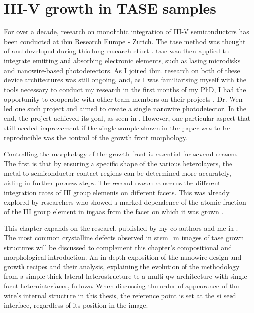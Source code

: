 \chapter{III-V growth in TASE samples}
\label{chap:growth}

For over a decade, research on monolithic integration of III-V semiconductors has been conducted at \acs{ibm} Research Europe - Zurich. The \acf{tase} method was thought of and developed during this long research effort \cite{borgTASEp2018, Mauthe2021}. \acs{tase} was then applied to integrate emitting and absorbing electronic elements, such as lasing microdisks and nanowire-based photodetectors. As I joined \acs{ibm}, research on both of these device architectures was still ongoing, and, as I was familiarising myself with the tools necessary to conduct my research in the first months of my PhD, I had the opportunity to cooperate with other team members on their projects \cite{Tiwari2021}. Dr. Wen led one such project and aimed to create a single nanowire photodetector. In the end, the project achieved its goal, as seen in \cite{Wen2022}. However, one particular aspect that still needed improvement if the single sample shown in the paper was to be reproducible was the control of the growth front morphology.

Controlling the morphology of the growth front is essential for several reasons. The first is that by ensuring a specific shape of the various heterolayers, the metal-to-semiconductor contact regions can be determined more accurately, aiding in further process steps. The second reason concerns the different integration rates of III group elements on different facets. This was already explored by researchers who showed a marked dependence of the atomic fraction of the III group element in \acs{ingaas} from the facet on which it was grown \cite{Borg2019}.

This chapter expands on the research published by my co-authors and me in \cite{Brugnolotto2023}. The most common crystalline defects observed in \acs{stem_m} images of \acs{tase} grown structures will be discussed to complement this chapter's compositional and morphological introduction. An in-depth exposition of the nanowire design and growth recipes and their analysis, explaining the evolution of the methodology from a simple thick lateral heterostructure to a multi-\acl{qw} architecture with single facet heterointerfaces, follows. When discussing the order of appearance of the wire's internal structure in this thesis, the reference point is set at the \acf{si} seed interface, regardless of its position in the image.

